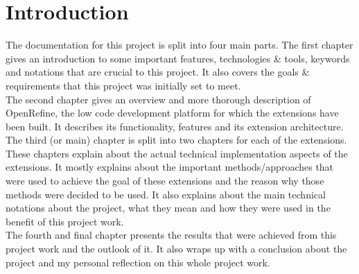\chapter{Introduction}\label{ch:introduction}
The documentation for this project is split into four main parts.
The first chapter gives an introduction to some important features, technologies \& tools, keywords and notations that are crucial to this project.
It also covers the goals \& requirements that this project was initially set to meet.\\
\newline
The second chapter gives an overview and more thorough description of OpenRefine,
the low code development platform for which the extensions have been built.
It describes its functionality, features and its extension architecture. \\
\newline
The third (or main) chapter is split into two chapters for each of the extensions.
These chapters explain about the actual technical implementation aspects of the extensions.
It mostly explains about the important methods/approaches that were used to achieve the goal of these extensions and the reason why those methods were decided to be used.
It also explains about the main technical notations about the project, what they mean and how they were used in the benefit of this project work.\\
\newline
The fourth and final chapter presents the results that were achieved from this project work and the outlook of it.
It also wraps up with a conclusion about the project and my personal reflection on this whole project work.
\pagebreak
